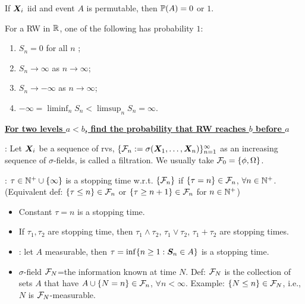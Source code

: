 \documentclass[10pt,a4paper]{article}
\begin{document}
\begin{thmbox}
\begin{theorem}\label{thm:HS01Law}
	If $\X_i$ iid and event $A$ is permutable, then $\bbP(A)=0$ or $1$.   
\end{theorem}
\end{thmbox}

\begin{thmbox}
	\begin{theorem}\label{thm:longTermRW-1d}
		For a RW in $\bbR$, one of the following has probability $1$:
		\begin{enumerate}[label=(\roman*)]
			\item $S_n=0$ for all $n$ ;
			\item $S_n\to \infty $ as $n\to \infty $;
			\item $S_n\to - \infty $ as $n\to \infty $;
			\item $- \infty = \liminf_{n} S_n < \limsup_n S_n=\infty $.   
		\end{enumerate}  
	\end{theorem}
\end{thmbox}

\noindent \underline{\textbf{For two levels $a<b$, find the probability that RW reaches $b$ before $a$}}

\noindent {}: Let $\X_i$ be a sequence of rvs, $\{\calF_n:=\sigma(\X_1,\ldots,\X_n)\}_{n=1}^\infty $ as an increasing sequence of $\sigma$-fields, is called a filtration. We usually take $\calF_0=\{\phi,\Omega\}$.  

\noindent {}: $\tau\in\bbN^+\cup\{\infty \}$ is a stopping time w.r.t. $\{\calF_n\}$ if $\{\tau=n\}\in\calF_n$, $\forall n\in\bbN^+$. (Equivalent def: $\{\tau\leq n\}\in\calF_n$ or $\{\tau\geq n+1\}\in\calF_n$ for $n\in\bbN^+$)
\begin{itemize}
	\item Constant $\tau=n$ is a stopping time. 
	\item If $\tau_1,\tau_2$ are stopping time, then $\tau_1\wedge\tau_2$, $\tau_1\vee\tau_2$, $\tau_1+\tau_2$ are stopping times.    
	\item {}: let $A$ measurable, then $\tau=\inf\{n\geq 1:\S_n\in A\}$ is a stopping time.     
	\item $\sigma$-field $\calF_N$=the information known at time $N$. Def: $\calF_N$ is the collection of sets $A$ that have $A\cup\{N=n\}\in\calF_n$, $\forall n< \infty $. Example: $\{N\leq n\}\in\calF_N$, i.e., $N$ is $\calF_N$-measurable.          
\end{itemize}
\end{document}
